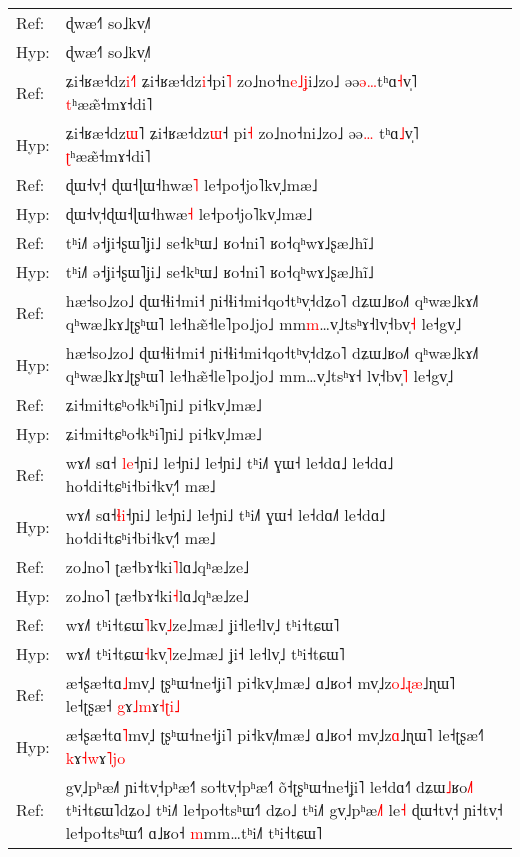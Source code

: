 \documentclass[10pt]{article}
\DeclareRobustCommand{\hl}[1]{{\textcolor{red}{#1}}}
\begin{document}
\begin{longtable}{ll}
\midrule 
Ref: & ɖwæ˧˥ so˩kv̩˩˥ \\ 
Hyp: & ɖwæ˧˥ so˩kv̩˩˥ \\ 
\midrule 
Ref: & ʑi˧ʁæ˧dz\hl{i}\hl{˧}˥ ʑi˧ʁæ˧dz\hl{i}˧pi\hl{˥} zo˩no˧n\hl{e}\hl{˩}\hl{ʝ}i˩zo˩ əə\hl{ə}\hl{…}tʰɑ\hl{˧}v̩˥ \hl{t}ʰææ̃˧mɤ˧di˥ \\ 
Hyp: & ʑi˧ʁæ˧dz\hl{ɯ}˥ ʑi˧ʁæ˧dz\hl{ɯ}˧\hl{ }pi\hl{˧} zo˩no˧ni˩zo˩ əə\hl{…}\hl{ }tʰɑ\hl{˩}v̩˥ \hl{ʈ}ʰææ̃˧mɤ˧di˥ \\ 
\midrule 
Ref: & ɖɯ˧v̩˧\hl{ }ɖɯ˧ɭɯ˧hwæ\hl{˥} le˧po˧jo˥kv̩˩mæ˩ \\ 
Hyp: & ɖɯ˧v̩˧ɖɯ˧ɭɯ˧hwæ\hl{˧} le˧po˧jo˥kv̩˩mæ˩ \\ 
\midrule 
Ref: & tʰi˩˥ ə˧ʝi˧ʂɯ˥ʝi˩ se˧kʰɯ˩ ʁo˧ni˥ ʁo˧qʰwɤ˩ʂæ˩hĩ˩ \\ 
Hyp: & tʰi˩˥ ə˧ʝi˧ʂɯ˥ʝi˩ se˧kʰɯ˩ ʁo˧ni˥ ʁo˧qʰwɤ˩ʂæ˩hĩ˩ \\ 
\midrule 
Ref: & hæ˧so˩zo˩ ɖɯ˧ɬi˧mi˧ ɲi˧ɬi˧mi˧qo˧tʰv̩˧dʑo˥ dʑɯ˩ʁo˩˥ qʰwæ˩kɤ˩˥ qʰwæ˩kɤ˩ʈʂʰɯ˥ le˧hæ̃˧le˥po˩jo˩ mm\hl{m}…v̩˩tsʰɤ˧lv̩˧bv̩\hl{˧} le˧gv̩˩ \\ 
Hyp: & hæ˧so˩zo˩ ɖɯ˧ɬi˧mi˧ ɲi˧ɬi˧mi˧qo˧tʰv̩˧dʑo˥ dʑɯ˩ʁo˩˥ qʰwæ˩kɤ˩˥ qʰwæ˩kɤ˩ʈʂʰɯ˥ le˧hæ̃˧le˥po˩jo˩ mm…v̩˩tsʰɤ˧\hl{ }lv̩˧bv̩\hl{˥} le˧gv̩˩ \\ 
\midrule 
Ref: & ʑi˧mi˧tɕʰo˧kʰi˥ɲi˩ pi˧kv̩˩mæ˩ \\ 
Hyp: & ʑi˧mi˧tɕʰo˧kʰi˥ɲi˩ pi˧kv̩˩mæ˩ \\ 
\midrule 
Ref: & wɤ˩˥ sɑ˧\hl{ }\hl{l}\hl{e}˧ɲi˩ le˧ɲi˩ le˧ɲi˩ tʰi˩˥ ɣɯ˧ le˧dɑ˩ le˧dɑ˩ ho˧di˧tɕʰi˧bi˧kv̩˧˥ mæ˩ \\ 
Hyp: & wɤ˩˥ sɑ˧\hl{ɬ}\hl{i}˧ɲi˩ le˧ɲi˩ le˧ɲi˩ tʰi˩˥ ɣɯ˧ le˧dɑ˩\hl{˥} le˧dɑ˩ ho˧di˧tɕʰi˧bi˧kv̩˧˥ mæ˩ \\ 
\midrule 
Ref: & zo˩no˥ ʈæ˧bɤ˧ki\hl{˥}lɑ˩qʰæ˩ze˩ \\ 
Hyp: & zo˩no˥ ʈæ˧bɤ˧ki\hl{˧}lɑ˩qʰæ˩ze˩ \\ 
\midrule 
Ref: & wɤ˩˥ tʰi˧tɕɯ\hl{˥}kv̩\hl{˩}ze˩mæ˩ ʝi˧le˧lv̩˩ tʰi˧tɕɯ˥ \\ 
Hyp: & wɤ˩˥ tʰi˧tɕɯ\hl{˧}kv̩\hl{˥}ze˩mæ˩ ʝi˧\hl{ }le˧lv̩˩ tʰi˧tɕɯ˥ \\ 
\midrule 
Ref: & æ˧ʂæ˧tɑ\hl{˩}mv̩˩ ʈʂʰɯ˧ne˧ʝi˥ pi˧kv̩˩mæ˩ ɑ˩ʁo˧ mv̩˩z\hl{o}\hl{˩}\hl{ɻ}\hl{æ}˩ɳɯ˥ le˧ʈʂæ˧ \hl{g}ɤ\hl{˩}\hl{m}ɤ\hl{˧}\hl{ʈ}\hl{i}\hl{˩} \\ 
Hyp: & æ˧ʂæ˧tɑ\hl{˥}mv̩˩ ʈʂʰɯ˧ne˧ʝi˥ pi˧kv̩˩\hl{˥}mæ˩ ɑ˩ʁo˧ mv̩˩z\hl{ɑ}˩ɳɯ˥ le˧ʈʂæ˧\hl{˥} \hl{k}ɤ\hl{˧}\hl{w}ɤ\hl{˥}\hl{j}\hl{o} \\ 
\midrule 
Ref: & gv̩˩pʰæ˩˥ ɲi˧tv̩˧pʰæ˧˥ so˧tv̩˧pʰæ˧˥ õ˧ʈʂʰɯ˧ne˧ʝi˥ le˧dɑ˧˥ dʑɯ\hl{˩}ʁo\hl{˩}˥ tʰi˧tɕɯ˥dʑo˩ tʰi˩˥ le˧po˧tsʰɯ˧˥ dʑo˩ tʰi˩˥ gv̩˩pʰæ\hl{˩}˥ le\hl{˧}\hl{ }ɖɯ˧tv̩˧\hl{ }ɲi˧tv̩˧ le˧po˧tsʰɯ˧˥ ɑ˩ʁo˧ \hl{m}mm…tʰi˩˥ tʰi˧tɕɯ˥ \\ 

\end{longtable}
\end{document}
